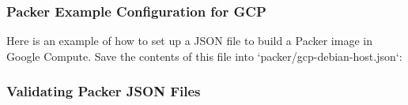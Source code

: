 \hypertarget{packer-example-configuration-for-gcp}{%
   \subsubsection{Packer Example Configuration for
      GCP}\label{packer-example-configuration-for-gcp}}

Here is an example of how to set up a JSON file to build a Packer image
in Google Compute. Save the contents of this file into
`packer/gcp-debian-host.json`:

\begin{Shaded}
   \begin{Highlighting}[]
      \KeywordTok{\{}
      \NormalTok{:}\BuiltInTok{ [}
      \NormalTok{      \{}
      \NormalTok{: }\NormalTok{,}
      \NormalTok{: }\NormalTok{,}
      \NormalTok{: }\NormalTok{,}
      \NormalTok{: }\NormalTok{,}
      \NormalTok{: }\NormalTok{,}
      \NormalTok{: }\NormalTok{,}
      \NormalTok{: }\NormalTok{,}
      \NormalTok{: }\NormalTok{,}
      \NormalTok{: \{ }\NormalTok{: }\NormalTok{ \}}
      \NormalTok{      \}}
      \NormalTok{   ],}
      \NormalTok{: [}
      \NormalTok{      \{}
      \NormalTok{: }\NormalTok{,}
      \NormalTok{: [}
      \NormalTok{,}
      \NormalTok{,}
      \NormalTok{         ]}
      \NormalTok{      \}}
      \NormalTok{   ]}
      \NormalTok{\}}
   \end{Highlighting}
\end{Shaded}

\hypertarget{validating-packer-json-files}{%
   \subsubsection{Validating Packer JSON
      Files}\label{validating-packer-json-files}}

